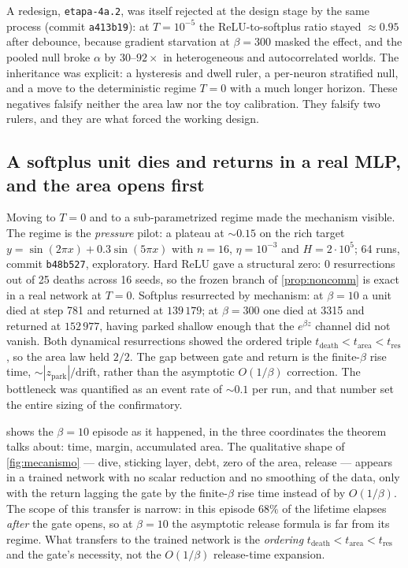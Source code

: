 \documentclass[11pt]{article}
\theoremstyle{definition}
\theoremstyle{remark}
\begin{document}
A redesign, \texttt{etapa-4a.2}, was itself rejected at the design stage by the same
process (commit \texttt{a413b19}): at $T=10^{-5}$ the ReLU-to-softplus ratio
stayed $\approx0.95$ after debounce, because gradient starvation at $\beta=300$
masked the effect, and the pooled null broke $\alpha$ by $30$--$92\times$ in
heterogeneous and autocorrelated worlds. The inheritance was explicit: a
hysteresis and dwell ruler, a per-neuron stratified null, and a move to the
deterministic regime $T=0$ with a much longer horizon. These negatives falsify
neither the area law nor the toy calibration. They falsify two rulers, and they
are what forced the working design.

\subsection{A softplus unit dies and returns in a real MLP, and the area opens
first}\label{sec:mechanism}

Moving to $T=0$ and to a sub-parametrized regime made the mechanism visible. The
regime is the \emph{pressure} pilot: a plateau at $\sim0.15$ on the rich target
$y=\sin(2\pi x)+0.3\sin(5\pi x)$ with $n=16$, $\eta=10^{-3}$ and
$H=2\cdot10^{5}$; 64 runs, commit \texttt{b48b527}, exploratory. Hard ReLU gave a
structural zero: 0 resurrections out of 25 deaths across 16 seeds, so the frozen
branch of \cref{prop:noncomm} is exact in a real network at $T=0$. Softplus
resurrected by mechanism: at $\beta=10$ a unit died at step 781 and returned at
$139\,179$; at $\beta=300$ one died at 3315 and returned at $152\,977$, having
parked shallow enough that the $e^{\beta z}$ channel did not vanish. Both
dynamical resurrections showed the ordered triple
$t_{\mathrm{death}}<t_{\mathrm{area}}<t_{\mathrm{res}}$, so the area law held
$2/2$. The gap between gate and return is the finite-$\beta$ rise time,
$\sim|z_{\mathrm{park}}|/\mathrm{drift}$, rather than the asymptotic $O(1/\beta)$
correction. The bottleneck was quantified as an event rate of $\sim0.1$ per run,
and that number set the entire sizing of the confirmatory.

 shows the $\beta=10$ episode as it happened, in the three
coordinates the theorem talks about: time, margin, accumulated area. The
qualitative shape of \cref{fig:mecanismo} --- dive, sticking layer, debt,
zero of the area, release --- appears in a trained network with no scalar
reduction and no smoothing of the data, only with the return lagging the gate by
the finite-$\beta$ rise time instead of by $O(1/\beta)$. The scope of this
transfer is
narrow: in this episode $68\%$ of the lifetime elapses
\emph{after} the gate opens, so at $\beta=10$ the asymptotic release formula is
far from its regime. What transfers to the trained network is the
\emph{ordering} $t_{\mathrm{death}}<t_{\mathrm{area}}<t_{\mathrm{res}}$ and
the gate's necessity, not the $O(1/\beta)$ release-time expansion.
\end{document}
